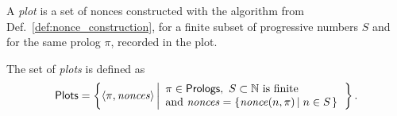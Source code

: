 %
A \emph{plot} is a set of nonces constructed with the algorithm
from Def.~\ref{def:nonce_construction},
for a finite subset of progressive numbers $S$ and
for the same prolog $\pi$, recorded in the plot.
%
\begin{definition}[Plot]
  The set of \emph{plots} is defined as
  \[
  {\mathsf{Plots}}=\left\{\left<\pi,{\mathit{nonces}}\right>\left|\begin{array}{l}
  \pi\in{\mathsf{Prologs}},\ S\subset\mathbb{N}\text{ is finite}\\
  \text{and }{\mathit{nonces}}=\left\{{\mathit{nonce}}(n,\pi)\left|\;n\in S\right.\right\}
  \end{array}\right.\right\}.
  \]
\end{definition}
